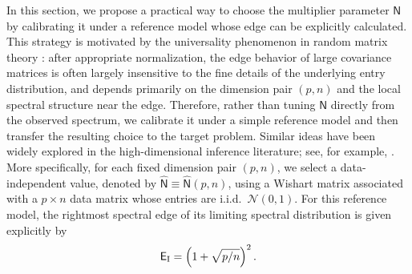 \documentclass[12pt]{article}
\def\sN{\mathsf N}
\theoremstyle{plain}
\numberwithin{equation}{section}
\begin{document}
In this section, we propose a practical way to choose the multiplier parameter $\sN$ by calibrating it under a reference model whose edge can be explicitly calculated. This strategy is motivated by the universality phenomenon in random matrix theory \citep{Akemann2011OxfordRMT,ErdosYau2017}: after appropriate normalization, the edge behavior of large covariance matrices is often largely insensitive to the fine details of the underlying entry distribution, and depends primarily on the dimension pair $(p,n)$ and the local spectral structure near the edge. Therefore, rather than tuning $\sN$ directly from the observed spectrum, we calibrate it under a simple reference model and then transfer the resulting choice to the target problem. Similar ideas have been widely explored in the high-dimensional inference literature; see, for example, \citep{Bao2015,9779233,passemier2014estimation,onatski2009formal}.
More specifically, for each fixed dimension pair $(p,n)$, we select a data-independent value, denoted by $\widehat{\sN}\equiv \widehat{\sN}(p,n)$, using a Wishart matrix \citep{anderson2003introduction} associated with a $p\times n$ data matrix whose entries are i.i.d.\ $\mathcal{N}(0,1)$. For this reference model, the rightmost spectral edge of its limiting spectral distribution is given explicitly by \citep{Johnstone2001} \vspace*{-10pt}
\begin{equation}\label{eq_edge}
	\vspace*{-10pt}
	\mathsf E_{\rm I}
	=
	\left(1+\sqrt{p/n}\right)^2.
\end{equation}
\end{document}
